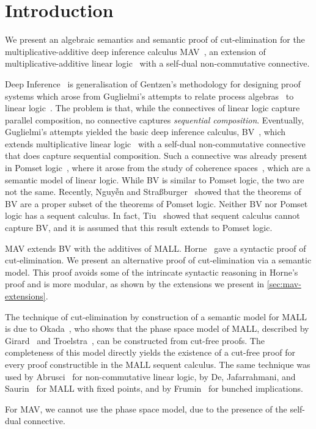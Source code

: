 \section{Introduction}\label{sec:introduction}

We present an algebraic semantics and semantic proof of cut-elimination for the multiplicative-additive deep inference calculus MAV~\cite{Horne15:mav}, an extension of multiplicative-additive linear logic~\cite[MALL]{Girard87:ll} with a self-dual non-commutative connective.

Deep Inference~\cite{Guglielmi14:di} is generalisation of Gentzen's methodology for designing proof systems which arose from Guglielmi's attempts to relate process algebras~\cite[CCS]{Milner89:CC,Milner80:CCS} to linear logic~\cite{Girard87:ll}.
The problem is that, while the connectives of linear logic capture parallel composition, no connective captures \emph{sequential composition}.
Eventually, Guglielmi's attempts yielded the basic deep inference calculus, BV~\cite{Guglielmi99:bv,Guglielmi07:sis}, which extends multiplicative linear logic~\cite[MLL]{Girard87:ll} with a self-dual non-commutative connective that does capture sequential composition.
Such a connective was already present in Pomset logic~\cite{Retore97:pomset}, where it arose from the study of coherence spaces~\cite[]{GirardTL89:proofs}, which are a semantic model of linear logic.
While BV is similar to Pomset logic, the two are not the same. Recently, Nguyễn and Stra{\ss}burger~\cite{NguyenS22:bvisnotpl} showed that the theorems of BV are a proper subset of the theorems of Pomset logic.
Neither BV nor Pomset logic has a sequent calculus. In fact, Tiu~\cite{Tiu06:sisii} showed that sequent calculus cannot capture BV, and it is assumed that this result extends to Pomset logic.

MAV extends BV with the additives of MALL. Horne~\cite{Horne15:mav} gave a syntactic proof of cut-elimination. We present an alternative proof of cut-elimination via a semantic model. This proof avoids some of the intrincate syntactic reasoning in Horne's proof and is more modular, as shown by the extensions we present in \cref{sec:mav-extensions}.

The technique of cut-elimination by construction of a semantic model for MALL is due to Okada~\cite{Okada99:psc}, who shows that the phase space model of MALL, described by Girard~\cite[\S4.1]{Girard87:ll} and Troelstra~\cite[]{Troelstra92:lll}, can be constructed from cut-free proofs.
The completeness of this model directly yields the existence of a cut-free proof for every proof constructible in the MALL sequent calculus.
The same technique was used by Abrusci~\cite{Abrusci91:psc} for non-commutative linear logic, by De, Jafarrahmani, and Saurin~\cite{De22:psc} for MALL with fixed points, and by Frumin~\cite{Frumin22:psc} for bunched implications.

For MAV, we cannot use the phase space model, due to the presence of the self-dual connective.
